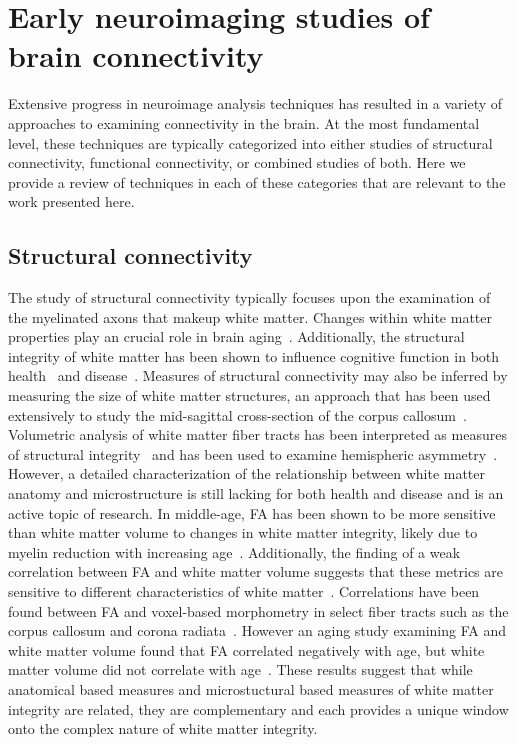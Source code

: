 
\section{Early neuroimaging studies of brain connectivity}
Extensive progress in neuroimage analysis techniques has resulted in a variety of approaches to examining connectivity in the brain. At the most fundamental level, these techniques are typically categorized into either studies of structural connectivity, functional connectivity, or combined studies of both. Here we provide a review of techniques in each of these categories that are relevant to the work presented here.

\subsection{Structural connectivity}
The study of structural connectivity typically focuses upon the examination of the myelinated axons that makeup white matter. Changes within white matter properties play an crucial role in brain aging~\cite{Abe2008,Allen2005,Bartzokis2004,Kochunov2007,Salat2005a,Salat2005,Walhovd2005,Wozniak2006,Westlye2009}. Additionally, the structural integrity of white matter has been shown to influence cognitive function in both health~\cite{Wolbers2006,Johansen-Berg2007,Tuch2005,Hoeft2007,Floel2009} and disease~\cite{DeCarli1995,Groot2001,Wessels2007,DuFouil2009}. Measures of structural connectivity may also be inferred by measuring the size of white matter structures, an approach that has been used extensively to study the mid-sagittal cross-section of the corpus callosum~\cite{Witelson1989,Colcombe2005a,Gunning-Dixon2000}. Volumetric analysis of white matter fiber tracts has been interpreted as measures of structural integrity~\cite{Salat2005a} and has been used to examine hemispheric asymmetry~\cite{Catani2007,Propper2010}. However, a detailed characterization of the relationship between white matter anatomy and microstructure is still lacking for both health and disease and is an active topic of research. In middle-age, FA has been shown to be more sensitive than white matter volume to changes in white matter integrity, likely due to myelin reduction with increasing age~\cite{Fjell2008}. Additionally, the finding of a weak correlation between FA and white matter volume suggests that these metrics are sensitive to different characteristics of white matter~\cite{Fjell2008}. Correlations have been found between FA and voxel-based morphometry in select fiber tracts such as the corpus callosum and corona radiata~\cite{Hugenschmidt2008}. However an aging study examining FA and white matter volume found that FA correlated negatively with age, but white matter volume did not correlate with age~\cite{Abe2008}. These results suggest that while anatomical based measures and microstuctural based measures of white matter integrity are related, they are complementary and each provides a unique window onto the complex nature of white matter integrity.

